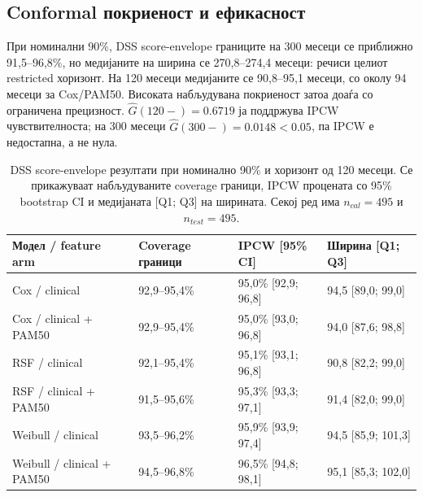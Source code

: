 \documentclass[12pt]{article}
\begin{document}
\subsection{Conformal покриеност и ефикасност}

При номинални 90\%, DSS score-envelope границите на 300 месеци се приближно
91,5--96,8\%, но медијаните на ширина се 270,8--274,4 месеци: речиси целиот
restricted хоризонт. На 120 месеци медијаните се 90,8--95,1 месеци, со околу
94 месеци за Cox/PAM50. Високата набљудувана покриеност затоа доаѓа со ограничена
прецизност. $\widehat G(120-)=0.6719$ ја поддржува IPCW чувствителноста; на
300 месеци $\widehat G(300-)=0.0148<0.05$, па IPCW е недостапна, а не нула.

\begin{table}[ht]
\centering
\caption{DSS score-envelope резултати при номинално 90\% и хоризонт од 120 месеци. Се прикажуваат набљудуваните coverage граници, IPCW процената со 95\% bootstrap CI и медијаната [Q1; Q3] на ширината. Секој ред има $n_{cal}=495$ и $n_{test}=495$.}
\label{tab:dss-conformal-90-120}
\footnotesize
\setlength{\tabcolsep}{3pt}
\begin{tabular}{p{}p{}p{}p{}}
\hline
Модел / feature arm & Coverage граници & IPCW [95\% CI] & Ширина [Q1; Q3] \\
\hline
Cox / clinical & 92,9--95,4\% & 95,0\% [92,9; 96,8] & 94,5 [89,0; 99,0] \\
Cox / clinical + PAM50 & 92,9--95,4\% & 95,0\% [93,0; 96,8] & 94,0 [87,6; 98,8] \\
RSF / clinical & 92,1--95,4\% & 95,1\% [93,1; 96,8] & 90,8 [82,2; 99,0] \\
RSF / clinical + PAM50 & 91,5--95,6\% & 95,3\% [93,3; 97,1] & 91,4 [82,0; 99,0] \\
Weibull / clinical & 93,5--96,2\% & 95,9\% [93,9; 97,4] & 94,5 [85,9; 101,3] \\
Weibull / clinical + PAM50 & 94,5--96,8\% & 96,5\% [94,8; 98,1] & 95,1 [85,3; 102,0] \\
\hline
\end{tabular}
\end{table}
\end{document}
